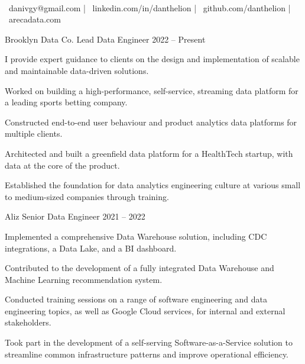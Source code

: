 \documentclass[]{awesome-cv}
\begin{document}
\begin{center}
	  \\
	\vspace{2mm}
	{\faEnvelope\ danivgy@gmail.com} | {\faLinkedin\ linkedin.com/in/danthelion} | {\faGithub\ github.com/danthelion} | {\faLink\ arecadata.com}
\end{center}
\begin{cventries}
	\cventry
	{Brooklyn Data Co.}
	{Lead Data Engineer}
	{2022 – Present}
	{}
	{\begin{cvitems}
		\item {I provide expert guidance to clients on the design and implementation of scalable and maintainable data-driven solutions.}
		\item {Worked on building a high-performance, self-service, streaming data platform for a leading sports betting company.}
		\item {Constructed end-to-end user behaviour and product analytics data platforms for multiple clients.}
		\item {Architected and built a greenfield data platform for a HealthTech startup, with data at the core of the product.}
		\item {Established the foundation for data analytics engineering culture at various small to medium-sized companies through training.}
		\end{cvitems}}
	\cventry
	{Aliz}
	{Senior Data Engineer}
	{2021 – 2022}
	{}
	{\begin{cvitems}
		\item {Implemented a comprehensive Data Warehouse solution, including CDC integrations, a Data Lake, and a BI dashboard.}
		\item {Contributed to the development of a fully integrated Data Warehouse and Machine Learning recommendation system.}
		\item {Conducted training sessions on a range of software engineering and data engineering topics, as well as Google Cloud services, for internal and external stakeholders.}
		\item {Took part in the development of a self-serving Software-as-a-Service solution to streamline common infrastructure patterns and improve operational efficiency.}
		\end{cvitems}}

\end{cventries}
\end{document}
